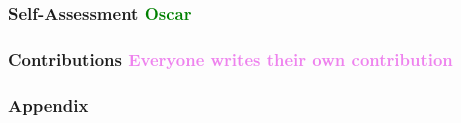 \documentclass[12pt, letterpaper]{article}
\begin{document}
\subsubsection*{Self-Assessment \textcolor{green}{Oscar}}

\subsubsection*{Contributions \textcolor{violet}{Everyone writes their own contribution}}





\pagebreak
\subsubsection*{Appendix}
\cite{Ahmed} %
\printbibliography
\end{document}

